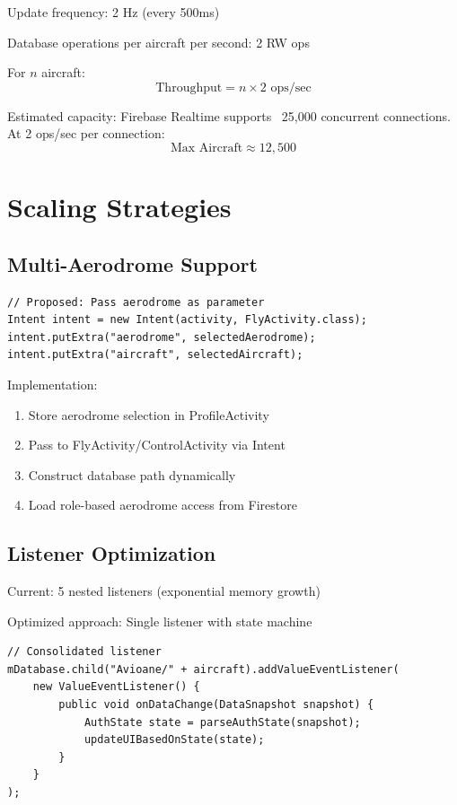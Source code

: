 \documentclass[11pt,a4paper]{report}
\begin{document}
Update frequency: 2 Hz (every 500ms)

Database operations per aircraft per second: 2 RW ops

For $n$ aircraft:
\[
\text{Throughput} = n \times 2 \text{ ops/sec}
\]

Estimated capacity: Firebase Realtime supports ~25,000 concurrent connections. At 2 ops/sec per connection:
\[
\text{Max Aircraft} \approx 12,500
\]

\section{Scaling Strategies}

\subsection{Multi-Aerodrome Support}

\begin{lstlisting}
// Proposed: Pass aerodrome as parameter
Intent intent = new Intent(activity, FlyActivity.class);
intent.putExtra("aerodrome", selectedAerodrome);
intent.putExtra("aircraft", selectedAircraft);
\end{lstlisting}

Implementation:
\begin{enumerate}
    \item Store aerodrome selection in ProfileActivity
    \item Pass to FlyActivity/ControlActivity via Intent
    \item Construct database path dynamically
    \item Load role-based aerodrome access from Firestore
\end{enumerate}

\subsection{Listener Optimization}

Current: 5 nested listeners (exponential memory growth)

Optimized approach: Single listener with state machine

\begin{lstlisting}
// Consolidated listener
mDatabase.child("Avioane/" + aircraft).addValueEventListener(
    new ValueEventListener() {
        public void onDataChange(DataSnapshot snapshot) {
            AuthState state = parseAuthState(snapshot);
            updateUIBasedOnState(state);
        }
    }
);
\end{lstlisting}
\end{document}
